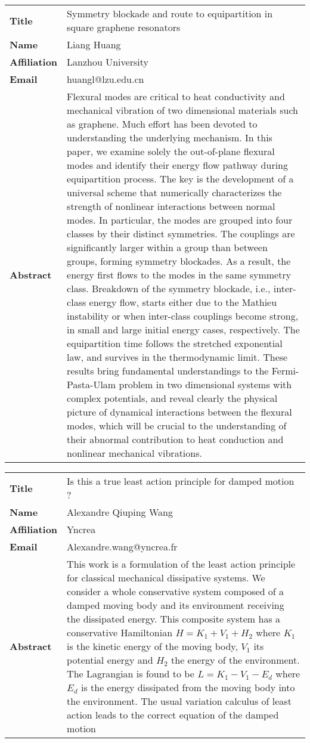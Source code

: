 \documentclass[oneside,A4paper,12pt]{article}
\begin{document}
\newpage
\begin{longtable}{p{2cm}p{14cm}}
\toprule
\textbf{Title} & Symmetry blockade and route to equipartition in square graphene resonators\\
\textbf{Name} & Liang Huang\\
\textbf{Affiliation} & Lanzhou University\\
\textbf{Email} & huangl@lzu.edu.cn\\
\textbf{Abstract} & Flexural modes are critical to heat conductivity and mechanical vibration of two dimensional materials such as graphene. Much effort has been devoted to understanding the underlying mechanism. In this paper, we examine solely the out-of-plane flexural modes and identify their energy flow pathway during equipartition process. The key is the development of a universal scheme that numerically characterizes the strength of nonlinear interactions between normal modes. In particular, the modes are grouped into four classes by their distinct symmetries. The couplings are significantly larger within a group than between groups, forming symmetry blockades. As a result, the energy first flows to the modes in the same symmetry class. Breakdown of the symmetry blockade, i.e., inter-class energy flow, starts either due to the Mathieu instability or when inter-class couplings become strong, in small and large initial energy cases, respectively. The equipartition time follows the stretched exponential law, and survives in the thermodynamic limit. These results bring fundamental understandings to the Fermi-Pasta-Ulam problem in two dimensional systems with complex potentials, and reveal clearly the physical picture of dynamical interactions between the flexural modes, which will be crucial to the understanding of their abnormal contribution to heat conduction and nonlinear mechanical vibrations.\\
\bottomrule
\end{longtable}

\newpage

\begin{longtable}{p{2cm}p{14cm}}
\toprule
\textbf{Title} & Is this a true least action principle for damped motion ?\\
\textbf{Name} & Alexandre Qiuping Wang\\
\textbf{Affiliation} & Yncrea\\
\textbf{Email} & Alexandre.wang@yncrea.fr\\
\textbf{Abstract} & This work is a formulation of the least action principle for classical mechanical dissipative systems. We consider a whole conservative system composed of a damped moving body and its environment receiving the dissipated energy. This composite system has a conservative Hamiltonian \(H=K_1+V_1+H_2\) where \(K_1\) is the kinetic energy of the moving body, \(V_1\) its potential energy and \(H_2\) the energy of the environment. The Lagrangian is found to be \(L=K_1-V_1-E_d\) where \(E_d\) is the energy dissipated from the moving body into the environment. The usual variation calculus of least action leads to the correct equation of the damped motion\\
\bottomrule
\end{longtable}
\end{document}
